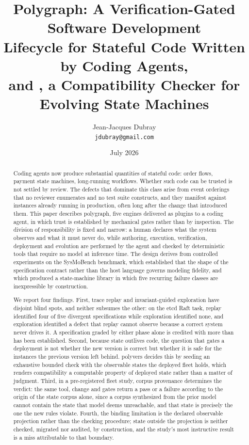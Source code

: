 \documentclass[11pt]{article}
\title{\textbf{Polygraph: A Verification-Gated Software Development\\
Lifecycle for Stateful Code Written by Coding Agents,\\
and \tool{polyvers}, a Compatibility Checker for Evolving State Machines}}
\author{Jean-Jacques Dubray\\
\texttt{jdubray@gmail.com}}
\date{July 2026}
\newcommand{\tool}[1]{\textsf{#1}}
\begin{document}
\maketitle

\begin{abstract}
\noindent Coding agents now produce substantial quantities of stateful code:
order flows, payment state machines, long-running workflows. Whether such code
can be trusted is not settled by review. The defects that dominate this class
arise from event orderings that no reviewer enumerates and no test suite
constructs, and they manifest against instances already running in production,
often long after the change that introduced them. This paper describes
\tool{polygraph}, five engines delivered as plugins to a coding agent, in which
trust is established by mechanical gates rather than by inspection. The division
of responsibility is fixed and narrow: a human declares what the system observes
and what it must never do, while authoring, execution, verification, deployment
and evolution are performed by the agent and checked by deterministic tools that
require no model at inference time. The design derives from controlled
experiments on the SysMoBench benchmark, which established that the shape of the
specification contract rather than the host language governs modeling fidelity,
and which produced a state-machine library in which five recurring failure
classes are inexpressible by construction.

We report four findings. First, trace replay and invariant-guided exploration
have disjoint blind spots, and neither subsumes the other: on the etcd Raft task,
replay identified four of five divergent specifications while exploration
identified none, and exploration identified a defect that replay cannot observe
because a correct system never drives it. A specification graded by either phase
alone is credited with more than has been established. Second, because state
outlives code, the question that gates a deployment is not whether the new
version is correct but whether it is safe for the instances the previous version
left behind. \tool{polyvers} decides this by seeding an exhaustive bounded check
with the observable states the deployed fleet holds, which renders compatibility
a computable property of deployed state rather than a matter of judgment. Third,
in a pre-registered fleet study, corpus provenance determines the verdict: the
same tool, change and gates return a pass or a failure according to the origin of
the state corpus alone, since a corpus synthesized from the prior model cannot
contain the state that model deems unreachable, and that state is precisely the
one the new rules violate. Fourth, the binding limitation is the declared
observable projection rather than the checking procedure; state outside the
projection is neither checked, migrated nor audited, by construction, and the
study's most instructive result is a miss attributable to that boundary.


\end{abstract}
\end{document}
